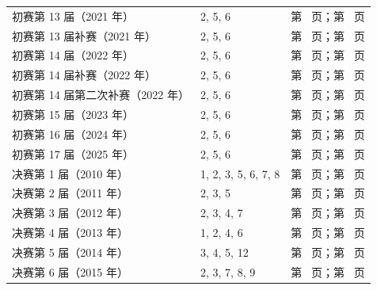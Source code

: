\documentclass[12pt,fontset=fandol]{ctexart}
\begin{document}
\begin{longtable}{p{}p{}p{}}
初赛第 13 届（2021 年） & 2, 5, 6 & 第~\pageref{ex:ch07-13th-A:2} 页；第~\pageref{ans:ch07-13th-A:2} 页\\

初赛第 13 届补赛（2021 年） & 2, 5, 6 & 第~\pageref{ex:ch08-13th-A-makeup:2} 页；第~\pageref{ans:ch08-13th-A-makeup:2} 页\\

初赛第 14 届（2022 年） & 2, 5, 6 & 第~\pageref{ex:ch04-14th-A:2} 页；第~\pageref{ans:ch04-14th-A:2} 页\\

初赛第 14 届补赛（2022 年） & 2, 5, 6 & 第~\pageref{ex:ch05-14th-A-makeup:2} 页；第~\pageref{ans:ch05-14th-A-makeup:2} 页\\

初赛第 14 届第二次补赛（2022 年） & 2, 5, 6 & 第~\pageref{ex:ch06-14th-A-makeup2:2} 页；第~\pageref{ans:ch06-14th-A-makeup2:2} 页\\

初赛第 15 届（2023 年） & 2, 5, 6 & 第~\pageref{ex:ch03-15th-A:2} 页；第~\pageref{ans:ch03-15th-A:2} 页\\

初赛第 16 届（2024 年） & 2, 5, 6 & 第~\pageref{ex:ch02-16th-A:2} 页；第~\pageref{ans:ch02-16th-A:2} 页\\

初赛第 17 届（2025 年） & 2, 5, 6 & 第~\pageref{ex:ch01-17th-A:2} 页；第~\pageref{ans:ch01-17th-A:2} 页\\

决赛第 1 届（2010 年） & 1, 2, 3, 5, 6, 7, 8 & 第~\pageref{ex:fin01-all:1} 页；第~\pageref{ans:fin01-all:1} 页\\

决赛第 2 届（2011 年） & 2, 3, 5 & 第~\pageref{ex:fin02-all:2} 页；第~\pageref{ans:fin02-all:2} 页\\

决赛第 3 届（2012 年） & 2, 3, 4, 7 & 第~\pageref{ex:fin03-all:2} 页；第~\pageref{ans:fin03-all:2} 页\\

决赛第 4 届（2013 年） & 1, 2, 4, 6 & 第~\pageref{ex:fin04-all:1} 页；第~\pageref{ans:fin04-all:1} 页\\

决赛第 5 届（2014 年） & 3, 4, 5, 12 & 第~\pageref{ex:fin05-hi:3} 页；第~\pageref{ans:fin05-hi:3} 页\\

决赛第 6 届（2015 年） & 2, 3, 7, 8, 9 & 第~\pageref{ex:fin06-lo:2} 页；第~\pageref{ans:fin06-lo:2} 页\\


\end{longtable}
\end{document}
